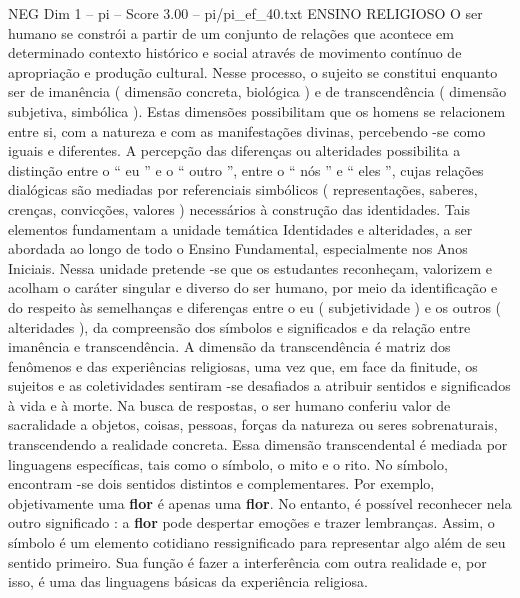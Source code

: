 \begin{textsample}{NEG Dim 1 – pi – Score 3.00 – pi/pi\_ef\_40.txt}  \label{ex:f1_neg_234}
ENSINO RELIGIOSO O ser humano se constrói a partir de um conjunto de relações que acontece em determinado contexto histórico e social através de movimento contínuo de apropriação e produção cultural.
Nesse processo, o sujeito se constitui enquanto ser de imanência ( dimensão concreta, biológica ) e de transcendência ( dimensão subjetiva, simbólica ).
Estas dimensões possibilitam que os homens se relacionem entre si, com a natureza e com as manifestações divinas, percebendo -se como iguais e diferentes.
A percepção das diferenças ou alteridades possibilita a distinção entre o “ eu ” e o “ outro ”, entre o “ nós ” e “ eles ”, cujas relações dialógicas são mediadas por referenciais simbólicos ( representações, saberes, crenças, convicções, valores ) necessários à construção das identidades.
Tais elementos fundamentam a unidade temática Identidades e alteridades, a ser abordada ao longo de todo o Ensino Fundamental, especialmente nos Anos Iniciais.
Nessa unidade pretende -se que os estudantes reconheçam, valorizem e acolham o caráter singular e diverso do ser humano, por meio da identificação e do respeito às semelhanças e diferenças entre o eu ( subjetividade ) e os outros ( alteridades ), da compreensão dos símbolos e significados e da relação entre imanência e transcendência.
A dimensão da transcendência é matriz dos fenômenos e das experiências religiosas, uma vez que, em face da finitude, os sujeitos e as coletividades sentiram -se desafiados a atribuir sentidos e significados à vida e à morte.
Na busca de respostas, o ser humano conferiu valor de sacralidade a objetos, coisas, pessoas, forças da natureza ou seres sobrenaturais, transcendendo a realidade concreta.
Essa dimensão transcendental é mediada por linguagens específicas, tais como o símbolo, o mito e o rito.
No símbolo, encontram -se dois sentidos distintos e complementares.
Por exemplo, objetivamente uma \textbf{flor} é apenas uma \textbf{flor}.
No entanto, é possível reconhecer nela outro significado : a \textbf{flor} pode despertar emoções e trazer lembranças.
Assim, o símbolo é um elemento cotidiano ressignificado para representar algo além de seu sentido primeiro.
Sua função é fazer a interferência com outra realidade e, por isso, é uma das linguagens básicas da experiência religiosa.

\end{textsample}
